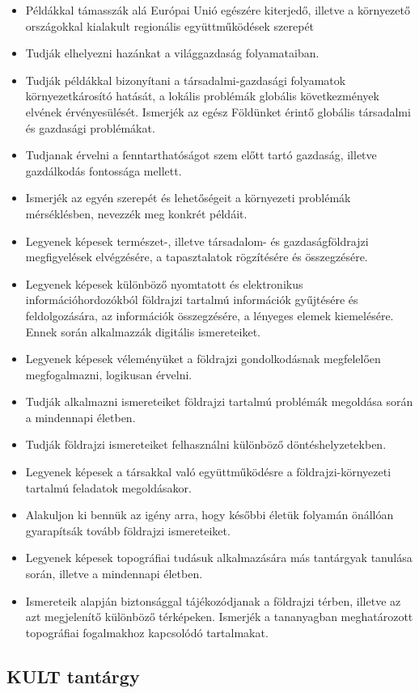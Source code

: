 \begin{itemize}
\item Példákkal támasszák alá Európai Unió egészére kiterjedő, illetve a környezető országokkal kialakult regionális együttműködések szerepét
\item Tudják elhelyezni hazánkat a világgazdaság folyamataiban.
\item Tudják példákkal bizonyítani a társadalmi-gazdasági folyamatok környezetkárosító hatását, a lokális problémák globális következmények elvének érvényesülését. Ismerjék az egész Földünket érintő globális társadalmi és gazdasági problémákat.
\item Tudjanak érvelni a fenntarthatóságot szem előtt tartó gazdaság, illetve gazdálkodás fontossága mellett.
\item Ismerjék az egyén szerepét és lehetőségeit a környezeti problémák mérséklésben, nevezzék meg konkrét példáit.
\item Legyenek képesek természet-, illetve társadalom- és gazdaságföldrajzi megfigyelések elvégzésére, a tapasztalatok rögzítésére és összegzésére.
\item Legyenek képesek különböző nyomtatott és elektronikus információhordozókból földrajzi tartalmú információk gyűjtésére és feldolgozására, az információk összegzésére, a lényeges elemek kiemelésére. Ennek során alkalmazzák digitális ismereteiket.
\item Legyenek képesek véleményüket a földrajzi gondolkodásnak megfelelően megfogalmazni, logikusan érvelni.
\item Tudják alkalmazni ismereteiket földrajzi tartalmú problémák megoldása során a mindennapi életben.
\item Tudják földrajzi ismereteiket felhasználni különböző döntéshelyzetekben.
\item Legyenek képesek a társakkal való együttműködésre a földrajzi-környezeti tartalmú feladatok megoldásakor.
\item Alakuljon ki bennük az igény arra, hogy későbbi életük folyamán önállóan gyarapítsák tovább földrajzi ismereteiket.
\item Legyenek képesek topográfiai tudásuk alkalmazására más tantárgyak tanulása során, illetve a mindennapi életben.
\item Ismereteik alapján biztonsággal tájékozódjanak a földrajzi térben, illetve az azt megjelenítő különböző térképeken. Ismerjék a tananyagban meghatározott topográfiai fogalmakhoz kapcsolódó tartalmakat.
\end{itemize}
\subsection{KULT tantárgy}
